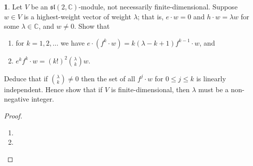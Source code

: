 \documentclass[12pt]{article}
\renewcommand{\sl}{\mathfrak{sl}}
\theoremstyle{definition}
\newtheorem{ex}{}
\begin{document}
\begin{ex}
	Let $V$ be an $\sl(2, \mathbb{C})$-module, not necessarily finite-dimensional.
	Suppose $w \in V$ is a highest-weight vector of weight $\lambda$; that is, $e \cdot w = 0$ and $h \cdot w = \lambda w$ for some $\lambda \in \mathbb{C}$, and $w \neq 0$.
	Show that
	\begin{enumerate}[label=(\roman*)]
		\item for $k = 1, 2, \dots$ we have $e \cdot (f^k \cdot w) = k(\lambda - k + 1)f^{k-1} \cdot w$, and
		\item $e^kf^k \cdot w = (k!)^2\binom{\lambda}{k}w$.
	\end{enumerate}
	Deduce that if $\binom{\lambda}{k} \neq 0$ then the set of all $f^j \cdot w$ for $0 \leq j \leq k$ is linearly independent.
	Hence show that if $V$ is finite-dimensional, then $\lambda$ must be a non-negative integer.
\end{ex}
\begin{proof}\
	\begin{enumerate}[label=(\roman*)]
		\item
		\item
	\end{enumerate}
\end{proof}
\end{document}
